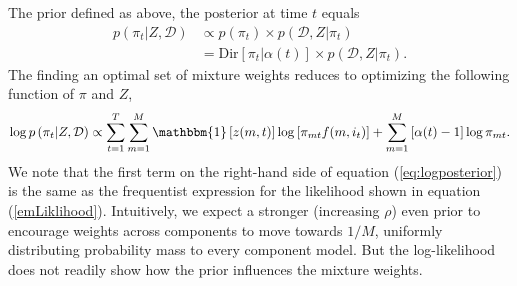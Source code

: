 \documentclass[12pt]{article}
\def\l{\left}
\def\r{\right}
\newcommand{\f}{\frac}
\begin{document}
The prior defined as above, the posterior at time $t$ equals
\begin{equation}
  \begin{aligned}
    p(\pi_{t} | Z, \mathcal{D}) &\propto p\l(\pi_{t}\r) \times p\l(\mathcal{D},Z | \pi_{t}\r)\\
    &= \text{Dir}\l[\pi_{t} | \alpha(t)\r] \times p\l(\mathcal{D},Z | \pi_{t}\r) \label{bayesModel}.
  \end{aligned}
\end{equation}
The finding an optimal set of mixture weights reduces to optimizing the following function of $\pi$ and $Z$,
\begin{align}
    \log p\l(\pi_{t}|Z,\mathcal{D}\r) \propto \sum_{t=1}^{T} \sum_{m=1}^{M} \mathbbm{1}\l[z(m,t)\r] \log\l[\pi_{mt}f(m,i_{t})\r] + \sum_{m=1}^{M} \l[\alpha(t)-1\r] \log \pi_{mt}. \label{eq:logposterior}
\end{align}
We note that the first term on the right-hand side of equation (\ref{eq:logposterior}) is the same as the frequentist expression for the likelihood shown in equation (\ref{emLiklihood}).  Intuitively, we expect a stronger (increasing $\rho$) even prior to encourage weights across components to move towards $1/M$, uniformly distributing probability mass to every component model.
But the log-likelihood does not readily show how the prior influences the mixture weights. 

\end{document}
